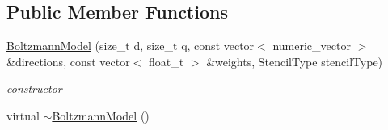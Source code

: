 \subsection*{\-Public \-Member \-Functions}
\begin{DoxyCompactItemize}
\item 
\hyperlink{classnatrium_1_1BoltzmannModel_a0547ee3c88330d7a2ac44ad3ece8d560}{\-Boltzmann\-Model} (size\-\_\-t d, size\-\_\-t q, const vector$<$ numeric\-\_\-vector $>$ \&directions, const vector$<$ float\-\_\-t $>$ \&weights, \-Stencil\-Type stencil\-Type)
\begin{DoxyCompactList}\small\item\em constructor \end{DoxyCompactList}\item 
\hypertarget{classnatrium_1_1BoltzmannModel_ac2e3dabcbe15c1e37ff09ec1c53dafa5}{virtual \hyperlink{classnatrium_1_1BoltzmannModel_ac2e3dabcbe15c1e37ff09ec1c53dafa5}{$\sim$\-Boltzmann\-Model} ()}\label{classnatrium_1_1BoltzmannModel_ac2e3dabcbe15c1e37ff09ec1c53dafa5}


\end{DoxyCompactItemize}
